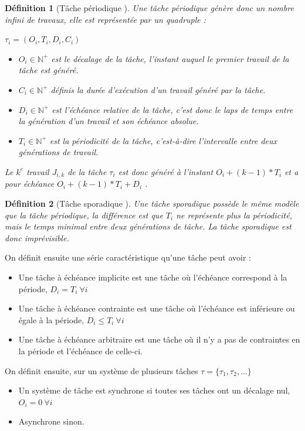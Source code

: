 \documentclass[a4paper]{report}
\theoremstyle{break}
\newtheorem{defin}{Définition}
\begin{document}
\begin{defin}[Tâche périodique \cite{goossens1999scheduling}]
Une tâche périodique génère donc un nombre infini de travaux, elle est représentée par un quadruple :
\begin{center}
$\tau_i = (O_i, T_i, D_i, C_i)$
\end{center}
\begin{itemize}
\item $O_i \in \mathbb{N}^{+}$ est le décalage de la tâche, l'instant auquel le premier travail de la tâche est généré.
\item $C_i \in \mathbb{N}^{+}$ définis la durée d'exécution d'un travail généré par la tâche.
\item $D_i \in \mathbb{N}^{+}$ est l'échéance relative de la tâche, c'est donc le laps de temps entre la génération d'un travail et son échéance absolue.
\item $T_i \in \mathbb{N}^{+}$ est la périodicité de la tâche, c'est-à-dire l'intervalle entre deux générations de travail.
\end{itemize}
Le $k^{e}$ travail $J_{i,k}$ de la tâche $\tau_i$ est donc généré à l'instant $O_i + (k-1)*T_i$ et a pour échéance  $O_i+(k-1)*T_i+D_i$ .
\end{defin}
\begin{defin}[Tâche sporadique \cite{goossens1999scheduling}]
Une tâche sporadique possède le même modèle que la tâche périodique, la différence est que $T_i$ ne représente plus la périodicité, mais le temps minimal entre deux générations de tâche. La tâche sporadique est donc imprévisible.
\end{defin}


On définit ensuite une série caractéristique \cite{goossens1999scheduling} qu'une tâche peut avoir :
\begin{itemize}
\item Une tâche à échéance implicite est une tâche où l'échéance correspond à la période, $D_i = T_i\ \forall i$
\item Une tâche à échéance contrainte est une tâche où l'échéance est inférieure ou égale à la période, $D_i \le T_i\ \forall i$
\item Une tâche à échéance arbitraire est une tâche où il n'y a pas de contraintes en la période et l'échéance de celle-ci.
\end{itemize}
On définit ensuite, sur un système de plusieurs tâches $\tau = \{\tau_1, \tau_2, ...\}$
\begin{itemize}
\item Un système de tâche est synchrone si toutes ses tâches ont un décalage nul, $O_i = 0\ \forall i$
\item Asynchrone sinon.
\end{itemize}
\end{document}
